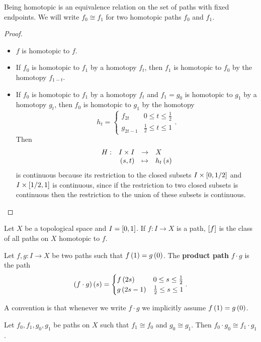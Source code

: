 \begin{lemma}
Being homotopic is an equivalence relation on the set of paths with fixed endpoints. We will write $ f_0 \cong f_1 $ for two homotopic paths $ f_0 $ and $ f_1 $.
\end{lemma}

\begin{proof}
\hfill
\begin{itemize}
\item $ f $ is homotopic to $ f $.
\item If $ f_0 $ is homotopic to $ f_1 $ by a homotopy $ f_t $, then $ f_1 $ is homotopic to $ f_0 $ by the homotopy $ f_{1 - t} $.
\item If $ f_0 $ is homotopic to $ f_1 $ by a homotopy $ f_t $ and $ f_1 = g_0 $ is homotopic to $ g_1 $ by a homotopy $ g_t $, then $ f_0 $ is homotopic to $ g_1 $ by the homotopy
$$ h_t =
\begin{cases}
f_{2t} & 0 \le t \le \tfrac{1}{2} \\
g_{2t - 1} & \tfrac{1}{2} \le t \le 1
\end{cases}.
$$
Then
$$ \function[H]{I \times I}{X}{\rb{s, t}}{h_t\rb{s}} $$
is continuous because its restriction to the closed subsets $ I \times \sb{0, 1 / 2} $ and $ I \times \sb{1 / 2, 1} $ is continuous, since if the restriction to two closed subsets is continuous then the restriction to the union of these subsets is continuous.
\end{itemize}
\end{proof}

\pagebreak


Let $ X $ be a topological space and $ I = \sb{0, 1} $. If $ f : I \to X $ is a path, $ \sb{f} $ is the class of all paths on $ X $ homotopic to $ f $.

\begin{definition*}
Let $ f, g : I \to X $ be two paths such that $ f\rb{1} = g\rb{0} $. The \textbf{product path} $ f \cdot g $ is the path
$$ \rb{f \cdot g}\rb{s} =
\begin{cases}
f\rb{2s} & 0 \le s \le \tfrac{1}{2} \\
g\rb{2s - 1} & \tfrac{1}{2} \le s \le 1
\end{cases}.
$$
\end{definition*}

A convention is that whenever we write $ f \cdot g $ we implicitly assume $ f\rb{1} = g\rb{0} $.

\begin{lemma}
\label{lem:1.2}
Let $ f_0, f_1, g_0, g_1 $ be paths on $ X $ such that $ f_1 \cong f_0 $ and $ g_0 \cong g_1 $. Then $ f_0 \cdot g_0 \cong f_1 \cdot g_1 $.
\end{lemma}

